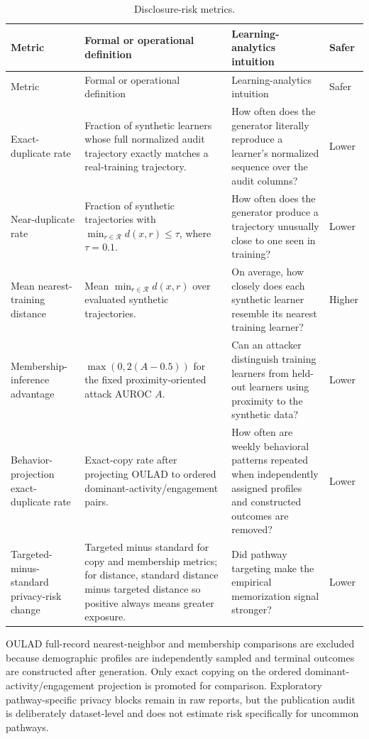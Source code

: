 \documentclass[10pt]{article}
\newcommand{\R}{\mathcal{R}}
\begin{document}
\begin{longtable}{@{}p{3.5cm}p{6.1cm}p{5.2cm}p{1.4cm}@{}}
\caption{Disclosure-risk metrics.}\label{tab:supp-dictionary-privacy}\\
\toprule
Metric & Formal or operational definition & Learning-analytics intuition & Safer \\
\midrule
\endfirsthead
\toprule
Metric & Formal or operational definition & Learning-analytics intuition & Safer \\
\midrule
\endhead
\bottomrule
\endlastfoot
Exact-duplicate rate & Fraction of synthetic learners whose full normalized audit trajectory exactly matches a real-training trajectory. & How often does the generator literally reproduce a learner's normalized sequence over the audit columns? & Lower \\
Near-duplicate rate & Fraction of synthetic trajectories with \(\min_{r\in\R}d(x,r)\leq\tau\), where \(\tau=0.1\). & How often does the generator produce a trajectory unusually close to one seen in training? & Lower \\
Mean nearest-training distance & Mean \(\min_{r\in\R}d(x,r)\) over evaluated synthetic trajectories. & On average, how closely does each synthetic learner resemble its nearest training learner? & Higher \\
Membership-inference advantage & \(\max(0,2(A-0.5))\) for the fixed proximity-oriented attack AUROC \(A\). & Can an attacker distinguish training learners from held-out learners using proximity to the synthetic data? & Lower \\
Behavior-projection exact-duplicate rate & Exact-copy rate after projecting OULAD to ordered dominant-activity/engagement pairs. & How often are weekly behavioral patterns repeated when independently assigned profiles and constructed outcomes are removed? & Lower \\
Targeted-minus-standard privacy-risk change & Targeted minus standard for copy and membership metrics; for distance, standard distance minus targeted distance so positive always means greater exposure. & Did pathway targeting make the empirical memorization signal stronger? & Lower \\
\end{longtable}

OULAD full-record nearest-neighbor and membership comparisons are excluded
because demographic profiles are independently sampled and terminal outcomes
are constructed after generation. Only exact copying on the ordered
dominant-activity/engagement projection is promoted for comparison. Exploratory
pathway-specific privacy blocks remain in raw reports, but the publication audit
is deliberately dataset-level and does not estimate risk specifically for
uncommon pathways.
\end{document}
